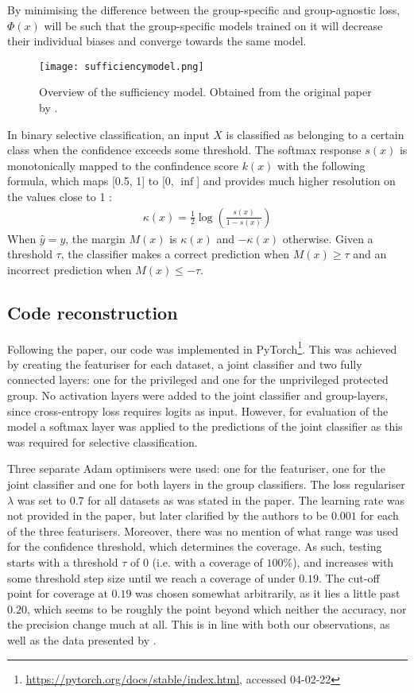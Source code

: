 By minimising the difference between the group-specific and group-agnostic loss, $\Phi(x)$ will be such that the group-specific models trained on it will decrease their individual biases and converge towards the same model.
\begin{figure}[h!]
  \centering
  \texttt{[image: sufficiencymodel.png]}
    \caption{Overview of the sufficiency model. Obtained from the original paper by \citep{lee2021fair}.}
    \label{sufficiencymodel}
\end{figure}
In binary selective classification, an input $X$ is classified as belonging to a certain class when the confidence exceeds some threshold. The softmax response $s(x)$ is monotonically mapped to the confindence score $k(x)$ with the following formula, which maps [0.5, 1] to [0, $\inf$] and provides much higher resolution on the values close to 1 \citep{lee2021fair}:
\begin{align*}
    \kappa (x) = \frac{1}{2} \log \left( \frac{s(x)}{1-s(x)} \right)
\end{align*}
When $\hat{y} = y$, the margin $M(x)$ is $\kappa (x)$ and $-\kappa(x)$ otherwise. Given a threshold $\tau$, the classifier makes a correct prediction when $M(x) \geq \tau$ and an incorrect prediction when $M(x) \leq -\tau$.

\subsection{Code reconstruction}

Following the paper, our code was implemented in PyTorch\footnote{\url{https://pytorch.org/docs/stable/index.html}, accessed 04-02-22}. This was achieved by creating the featuriser for each dataset, a joint classifier and two fully connected layers: one for the privileged and one for the unprivileged protected group. No activation layers were added to the joint classifier and group-layers, since cross-entropy loss requires logits as input. However, for evaluation of the model a softmax layer was applied to the predictions of the joint classifier as this was required for selective classification.

Three separate Adam optimisers were used: one for the featuriser, one for the joint classifier and one for both layers in the group classifiers. The loss regulariser $\lambda$ was set to 0.7 for all datasets as was stated in the paper. The learning rate was not provided in the paper, but later clarified by the authors to be $0.001$ for each of the three featurisers. Moreover, there was no mention of what range was used for the confidence threshold, which determines the coverage. As such, testing starts with a threshold $\tau$ of $0$ (i.e. with a coverage of $100$\%), and increases with some threshold step size until we reach a coverage of under $0.19$. The cut-off point for coverage at $0.19$ was chosen somewhat arbitrarily, as it lies a little past $0.20$, which seems to be roughly the point beyond which neither the accuracy, nor the precision change much at all. This is in line with both our observations, as well as the data presented by \cite{lee2021fair}.


